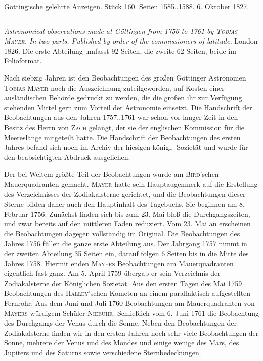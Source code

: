 \clearpage
{}
\hypertarget{native-649-lower}{}
\begin{center}\small Göttingische gelehrte Anzeigen. Stück 160. Seiten 1585..1588. 6. Oktober 1827.\\[3pt]\rule{.72\linewidth}{.3pt}\end{center}

\emph{Astronomical observations made at Göttingen from \textup{1756} to \textup{1761} by \textup{\textsc{Tobias Mayer}}. In two parts. Published by order of the commissioners of latitude.} London 1826. Die erste Abteilung umfasst 92 Seiten, die zweite 62 Seiten, beide im Folioformat.

Nach siebzig Jahren ist den Beobachtungen des großen Göttinger Astronomen \textsc{Tobias Mayer} noch die Auszeichnung zuteilgeworden, auf Kosten einer ausländischen Behörde gedruckt zu werden, die die großen ihr zur Verfügung stehenden Mittel gern zum Vorteil der Astronomie einsetzt. Die Handschrift der Beobachtungen aus den Jahren 1757..1761 war schon vor langer Zeit in den Besitz des Herrn von \textsc{Zach} gelangt, der sie der englischen Kommission für die Meereslänge mitgeteilt hatte. Die Handschrift der Beobachtungen des ersten Jahres befand sich noch im Archiv der hiesigen königl.\ Sozietät und wurde für den beabsichtigten Abdruck ausgeliehen.

Der bei Weitem größte Teil der Beobachtungen wurde am \textsc{Bird}'schen Mauerquadranten gemacht. \textsc{Mayer} hatte sein Hauptaugenmerk auf die Erstellung des Verzeichnisses der Zodiakalsterne gerichtet, und die Beobachtungen dieser Sterne bilden daher auch den Hauptinhalt des Tagebuchs. Sie beginnen am 8. Februar 1756. Zunächst finden sich bis zum 23. Mai bloß die Durchgangszeiten, und zwar bereits auf den mittleren Faden reduziert. Vom 23. Mai an erscheinen die Beobachtungen dagegen vollständig im Original. Die Beobachtungen des Jahres 1756 füllen die ganze erste Abteilung aus. Der Jahrgang 1757 nimmt in der zweiten Abteilung 35 Seiten ein, darauf folgen 6 Seiten bis in die Mitte des Jahres 1758. Hiermit enden \textsc{Mayers} Beobachtungen am Mauerquadranten eigentlich fast ganz. Am 5. April 1759 übergab er sein Verzeichnis der Zodiakalsterne der Königlichen Sozietät. Aus den ersten Tagen des Mai 1759 Beobachtungen des \textsc{Halley}'schen Kometen an einem parallaktisch aufgestellten Fernrohr. Aus dem Juni und Juli 1760 Beobachtungen am Mauerquadranten von \textsc{Mayers} würdigem Schüler \textsc{Niebuhr}. Schließlich vom 6. Juni 1761 die Beobachtung des Durchgangs der Venus durch die Sonne. Neben den Beobachtungen der Zodiakalsterne finden wir in den ersten Jahren noch sehr viele Beobachtungen der Sonne, mehrere der Venus und des Mondes und einige wenige des Mars, des Jupiters und des Saturns sowie verschiedene Sternbedeckungen.


